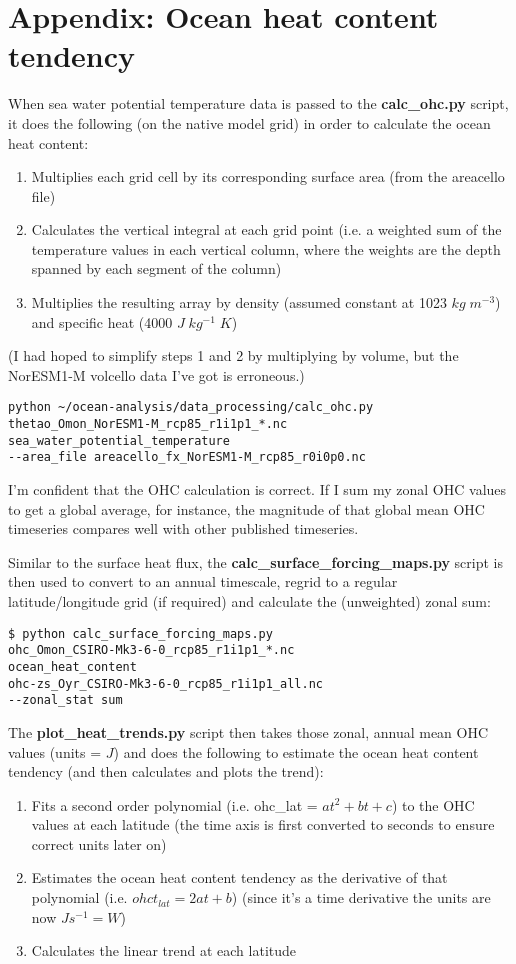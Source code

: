 \section{Appendix: Ocean heat content tendency}

When sea water potential temperature data is passed to the \textbf{calc_ohc.py} script, it does the following (on the native model grid) in order to calculate the ocean heat content:
\begin{enumerate}
\item Multiplies each grid cell by its corresponding surface area (from the areacello file)
\item Calculates the vertical integral at each grid point (i.e. a weighted sum of the temperature values in each vertical column, where the weights are the depth spanned by each segment of the column)
\item Multiplies the resulting array by density (assumed constant at 1023 $kg\; m^{-3}$) and specific heat (4000 $J\; kg^{-1}\; K$)
\end{enumerate}

(I had hoped to simplify steps 1 and 2 by multiplying by volume, but the NorESM1-M volcello data I've got is erroneous.) 

\begin{verbatim}
python ~/ocean-analysis/data_processing/calc_ohc.py 
thetao_Omon_NorESM1-M_rcp85_r1i1p1_*.nc 
sea_water_potential_temperature
--area_file areacello_fx_NorESM1-M_rcp85_r0i0p0.nc
\end{verbatim}

I'm confident that the OHC calculation is correct. If I sum my zonal OHC values to get a global average, for instance, the magnitude of that global mean OHC timeseries compares well with other published timeseries.

Similar to the surface heat flux, the \textbf{calc_surface_forcing_maps.py} script is then used to convert to an annual timescale, regrid to a regular latitude/longitude grid (if required) and calculate the (unweighted) zonal sum:

\begin{verbatim}
$ python calc_surface_forcing_maps.py 
ohc_Omon_CSIRO-Mk3-6-0_rcp85_r1i1p1_*.nc
ocean_heat_content
ohc-zs_Oyr_CSIRO-Mk3-6-0_rcp85_r1i1p1_all.nc
--zonal_stat sum
\end{verbatim}

The \textbf{plot_heat_trends.py} script then takes those zonal, annual mean OHC values (units = $J$) and does the following to estimate the ocean heat content tendency (and then calculates and plots the trend):
\begin{enumerate}
\item Fits a second order polynomial (i.e. ohc_{lat} = $at^2 + bt + c$) to the OHC values at each latitude (the time axis is first converted to seconds to ensure correct units later on)
\item Estimates the ocean heat content tendency as the derivative of that polynomial (i.e. $ohct_{lat} = 2at + b$) (since it's a time derivative the units are now $Js^{-1} = W$)
\item Calculates the linear trend at each latitude
\end{enumerate}

